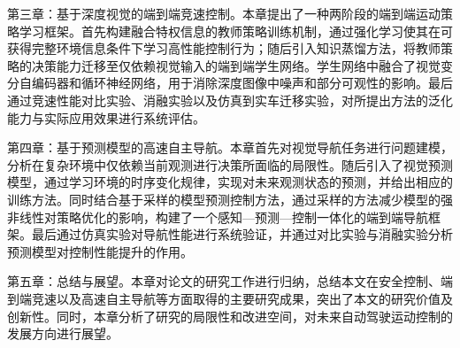 第三章：基于深度视觉的端到端竞速控制。本章提出了一种两阶段的端到端运动策略学习框架。首先构建融合特权信息的教师策略训练机制，通过强化学习使其在可获得完整环境信息条件下学习高性能控制行为；随后引入知识蒸馏方法，将教师策略的决策能力迁移至仅依赖视觉输入的端到端学生网络。学生网络中融合了视觉变分自编码器和循环神经网络，用于消除深度图像中噪声和部分可观性的影响。最后通过竞速性能对比实验、消融实验以及仿真到实车迁移实验，对所提出方法的泛化能力与实际应用效果进行系统评估。

第四章：基于预测模型的高速自主导航。本章首先对视觉导航任务进行问题建模，分析在复杂环境中仅依赖当前观测进行决策所面临的局限性。随后引入了视觉预测模型，通过学习环境的时序变化规律，实现对未来观测状态的预测，并给出相应的训练方法。同时结合基于采样的模型预测控制方法，通过采样的方法减少模型的强非线性对策略优化的影响，构建了一个感知—预测—控制一体化的端到端导航框架。最后通过仿真实验对导航性能进行系统验证，并通过对比实验与消融实验分析预测模型对控制性能提升的作用。

第五章：总结与展望。本章对论文的研究工作进行归纳，总结本文在安全控制、端到端竞速以及高速自主导航等方面取得的主要研究成果，突出了本文的研究价值及创新性。同时，本章分析了研究的局限性和改进空间，对未来自动驾驶运动控制的发展方向进行展望。